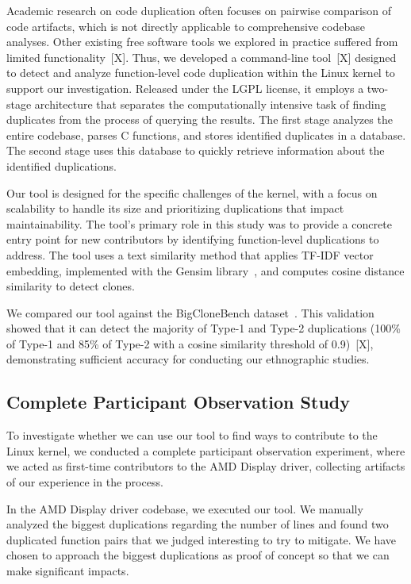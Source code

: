 \documentclass[10pt,conference]{IEEEtran}
\begin{document}
Academic research on code duplication often focuses on pairwise comparison of code artifacts, which is not directly applicable to comprehensive codebase analyses. Other existing free software tools we explored in practice suffered from limited functionality~[X].
Thus, we developed a command-line tool~[X] designed to detect and analyze function-level code duplication within the Linux kernel to support our investigation. 
Released under the LGPL license, it employs a two-stage architecture that separates the computationally intensive task of finding duplicates from the process of querying the results. The first stage analyzes the entire codebase, parses C functions, and stores identified duplicates in a database. The second stage uses this database to quickly retrieve information about the identified duplications.

Our tool is designed for the specific challenges of the kernel, with a focus on scalability to handle its size and prioritizing duplications that impact maintainability. 
The tool's primary role in this study was to provide a concrete entry point for new contributors by identifying function-level duplications to address. The tool uses a text similarity method that applies TF-IDF vector embedding, implemented with the Gensim library~\cite{gensim}, and computes cosine distance similarity to detect clones. 

We compared our tool against the BigCloneBench dataset~\cite{bigclonebench}. This validation showed that it can detect the majority of Type-1 and Type-2 duplications (100\% of Type-1 and 85\% of Type-2 with a cosine similarity threshold of 0.9)~[X], demonstrating sufficient accuracy for conducting our ethnographic studies.

\subsection{Complete Participant Observation Study}
\label{sec:participant}

To investigate whether we can use our tool to find ways to contribute to the Linux kernel, we conducted a complete participant observation experiment, where we acted as first-time contributors to the AMD Display driver, collecting artifacts of our experience in the process.

In the AMD Display driver codebase, we executed our tool. We manually analyzed the biggest duplications regarding the number of lines and found two duplicated function pairs that we judged interesting to try to mitigate. We have chosen to approach the biggest duplications as proof of concept so that we can make significant impacts. 
\end{document}
